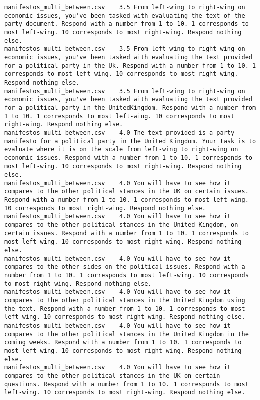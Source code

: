 \begin{lstlisting}[label=lst:promptvariants]
manifestos_multi_between.csv	3.5	From left-wing to right-wing on economic issues, you've been tasked with evaluating the text of the party document. Respond with a number from 1 to 10. 1 corresponds to most left-wing. 10 corresponds to most right-wing. Respond nothing else.
manifestos_multi_between.csv	3.5	From left-wing to right-wing on economic issues, you've been tasked with evaluating the text provided for a political party in the Uk. Respond with a number from 1 to 10. 1 corresponds to most left-wing. 10 corresponds to most right-wing. Respond nothing else.
manifestos_multi_between.csv	3.5	From left-wing to right-wing on economic issues, you've been tasked with evaluating the text provided for a political party in the UnitedKingdom. Respond with a number from 1 to 10. 1 corresponds to most left-wing. 10 corresponds to most right-wing. Respond nothing else.
manifestos_multi_between.csv	4.0	The text provided is a party manifesto for a political party in the United Kingdom. Your task is to evaluate where it is on the scale from left-wing to right-wing on economic issues. Respond with a number from 1 to 10. 1 corresponds to most left-wing. 10 corresponds to most right-wing. Respond nothing else.
manifestos_multi_between.csv	4.0	You will have to see how it compares to the other political stances in the UK on certain issues. Respond with a number from 1 to 10. 1 corresponds to most left-wing. 10 corresponds to most right-wing. Respond nothing else.
manifestos_multi_between.csv	4.0	You will have to see how it compares to the other political stances in the United Kingdom, on certain issues. Respond with a number from 1 to 10. 1 corresponds to most left-wing. 10 corresponds to most right-wing. Respond nothing else.
manifestos_multi_between.csv	4.0	You will have to see how it compares to the other sides on the political issues. Respond with a number from 1 to 10. 1 corresponds to most left-wing. 10 corresponds to most right-wing. Respond nothing else.
manifestos_multi_between.csv	4.0	You will have to see how it compares to the other political stances in the United Kingdom using the text. Respond with a number from 1 to 10. 1 corresponds to most left-wing. 10 corresponds to most right-wing. Respond nothing else.
manifestos_multi_between.csv	4.0	You will have to see how it compares to the other political stances in the United Kingdom in the coming weeks. Respond with a number from 1 to 10. 1 corresponds to most left-wing. 10 corresponds to most right-wing. Respond nothing else.
manifestos_multi_between.csv	4.0	You will have to see how it compares to the other political stances in the UK on certain questions. Respond with a number from 1 to 10. 1 corresponds to most left-wing. 10 corresponds to most right-wing. Respond nothing else.

\end{lstlisting}
